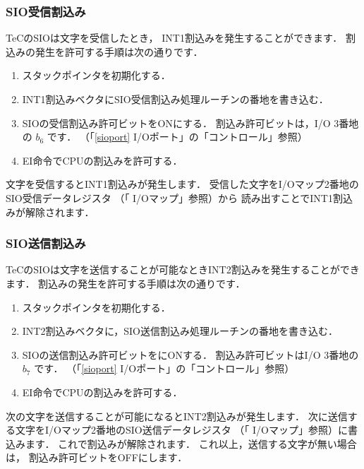 \subsubsection{SIO受信割込み}
TeCのSIOは文字を受信したとき，
INT1割込みを発生することができます．
割込みの発生を許可する手順は次の通りです．

\begin{enumerate}
\item スタックポインタを初期化する．
\item INT1割込みベクタにSIO受信割込み処理ルーチンの番地を書き込む．
\item SIOの受信割込み許可ビットをONにする．
割込み許可ビットは，I/O 3番地の $b_6$ です．
（「\ref{sioport} I/Oポート」の「コントロール」参照）
\item EI命令でCPUの割込みを許可する．

\end{enumerate}

文字を受信するとINT1割込みが発生します．
受信した文字をI/Oマップ2番地のSIO受信データレジスタ
（「 I/Oマップ」参照）から
読み出すことでINT1割込みが解除されます．


\subsubsection{SIO送信割込み}

TeCのSIOは文字を送信することが可能なときINT2割込みを発生することができます．
割込みの発生を許可する手順は次の通りです．

\begin{enumerate}
\item スタックポインタを初期化する．
\item INT2割込みベクタに，SIO送信割込み処理ルーチンの番地を書き込む．
\item SIOの送信割込み許可ビットをにONする．
割込み許可ビットはI/O 3番地の $b_7$ です．
（「\ref{sioport} I/Oポート」の「コントロール」参照）
\item EI命令でCPUの割込みを許可する．
\end{enumerate}

次の文字を送信することが可能になるとINT2割込みが発生します．
次に送信する文字をI/Oマップ2番地のSIO送信データレジスタ
（「 I/Oマップ」参照）に書込みます．
これで割込みが解除されます．
これ以上，送信する文字が無い場合は，
割込み許可ビットをOFFにします．

